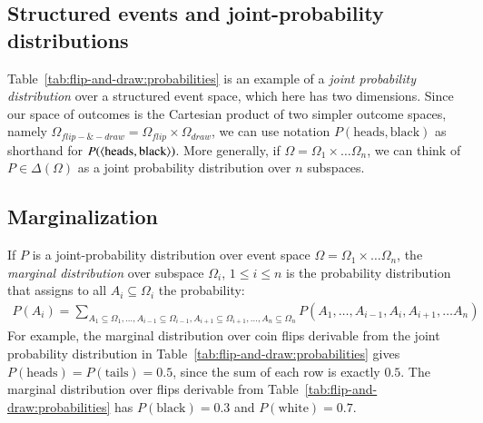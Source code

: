 \documentclass[nobib,nofonts]{tufte-handout}
\renewcommand{\markdef}[1]{\emph{#1}}
\begin{document}
\subsection{Structured events and joint-probability distributions}

Table~\ref{tab:flip-and-draw:probabilities} is an example of a \markdef{joint
  probability distribution} over a structured event space, which here has two dimensions. Since
our space of outcomes is the Cartesian product of two simpler outcome spaces, namely
$\Omega_{flip-\&-draw} = \Omega_{flip} \times \Omega_{draw}$, we can use notation
$P(\text{heads}, \text{black})$ as shorthand for $P(\left \langle \text{heads}, \text{black}\right\rangle)$. More
generally, if $\Omega = \Omega_1 \times \dots \Omega_n$, we can think of $P \in \Delta(\Omega)$
as a joint probability distribution over $n$ subspaces.

\subsection{Marginalization}

If $P$ is a joint-probability distribution over event space $\Omega = \Omega_1 \times \dots
\Omega_n$, the \markdef{marginal distribution} over subspace  $\Omega_i$, $1 \le
i \le n$ is the probability distribution that assigns to all $A_i \subseteq \Omega_i$ the probability:
\begin{align*}
  P(A_i) = \sum_{A_1 \subseteq \Omega_{1}, \dots , A_{i-1} \subseteq \Omega_{i-1}, A_{i+1} \subseteq \Omega_{i+1}, \dots, A_n \subseteq \Omega_n} P(A_1, \dots, A_{i-1}, A_{i}, A_{i+1}, \dots A_n)
\end{align*}
For example, the marginal distribution over coin flips derivable from the joint probability
distribution in Table~\ref{tab:flip-and-draw:probabilities} gives $P(\text{heads}) = P(\text{tails}) =
0.5$, since the sum of each row is exactly $0.5$. The marginal distribution over flips
derivable from Table~\ref{tab:flip-and-draw:probabilities} has $P(\text{black}) = 0.3$ and
$P(\text{white}) = 0.7$.
\end{document}
